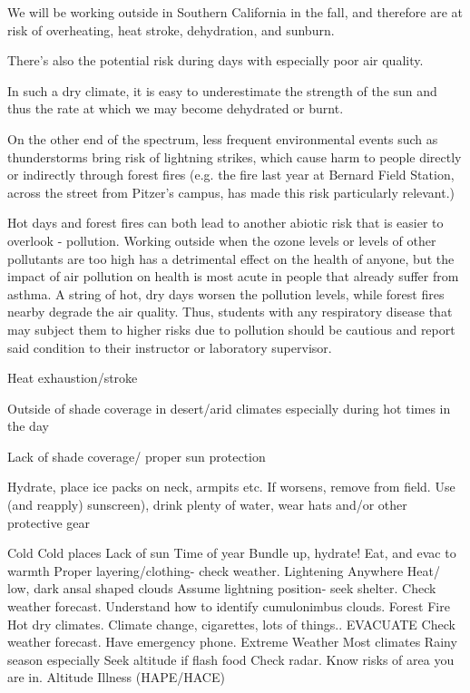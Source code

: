 \documentclass[12pt]{../SOP2}
\begin{document}
\NP We will be working outside in Southern California in the fall, and therefore are at risk of overheating, heat stroke, dehydration, and sunburn. 

\NP There's also the potential risk during days with especially poor air quality. 

\NP In such a dry climate, it is easy to underestimate the strength of the sun and thus the rate at which we may become dehydrated or burnt.  

\NP On the other end of the spectrum, less frequent environmental events such as thunderstorms bring risk of lightning strikes, which cause harm to people directly or indirectly through forest fires (e.g. the fire last year at Bernard Field Station, across the street from Pitzer's campus, has made this risk particularly relevant.)

\NP Hot days and forest fires can both lead to another abiotic risk that is easier to overlook - pollution. Working outside when the ozone levels or levels of other pollutants are too high has a detrimental effect on the health of anyone, but the impact of air pollution on health is most acute in people that already suffer from asthma. A string of hot, dry days worsen the pollution levels, while forest fires nearby degrade the air quality. Thus, students with any respiratory disease that may subject them to higher risks due to pollution should be cautious and report said condition to their instructor or laboratory supervisor. 

\NP Heat exhaustion/stroke

\NP Outside of shade coverage in desert/arid climates especially during hot times in the day

\NP Lack of shade coverage/ proper sun protection

\NP Hydrate, place ice packs on neck, armpits etc. If worsens, remove from field.
Use (and reapply) sunscreen), drink plenty of water, wear hats and/or other protective gear

Cold
Cold places
Lack of sun
Time of year
Bundle up, hydrate! Eat, and evac to warmth
Proper layering/clothing- check weather.
Lightening
Anywhere
Heat/ low, dark ansal shaped clouds
Assume lightning position- seek shelter.
Check weather forecast. Understand how to identify cumulonimbus clouds.
Forest Fire
Hot dry climates.
Climate change, cigarettes, lots of things..
EVACUATE
Check weather forecast. Have emergency phone.
Extreme Weather
Most climates
Rainy season especially
Seek altitude if flash food
Check radar. Know risks of area you are in.
Altitude Illness (HAPE/HACE)
\end{document}
